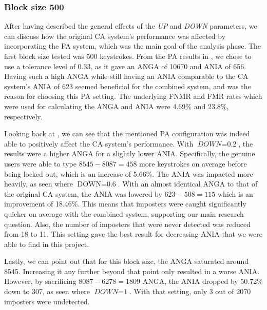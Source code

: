 \subsubsection{Block size 500}
After having described the general effects of the \textit{UP} and \textit{DOWN} parameters, we can discuss how the original CA system's performance was affected by incorporating the PA system, which was the main goal of the analysis phase.
The first block size tested was 500 keystrokes.
From the PA results in , we chose to use a tolerance level of 0.33, as it gave an ANGA of 10670 and ANIA of 656.
Having such a high ANGA while still having an ANIA comparable to the CA system's ANIA of 623 seemed beneficial for the combined system, and was the reason for choosing this PA setting.
The underlying FNMR and FMR rates which were used for calculating the ANGA and ANIA were 4.69\% and 23.8\%, respectively.

Looking back at , we can see that the mentioned PA configuration was indeed able to positively affect the CA system's performance.
With $\textit{DOWN} = \text{0.2}$, the results were a higher ANGA for a slightly lower ANIA.
Specifically, the genuine users were able to type $8545-8087 = 458$ more keystrokes on average before being locked out, which is an increase of 5.66\%.
The ANIA was impacted more heavily, as seen where $\text{DOWN} = \text{0.6}$.
With an almost identical ANGA to that of the original CA system, the ANIA was lowered by $\text{623}-\text{508} = \text{115}$ which is an improvement of 18.46\%.
This means that imposters were caught significantly quicker on average with the combined system, supporting our main research question.
Also, the number of imposters that were never detected was reduced from 18 to 11.
This setting gave the best result for decreasing ANIA that we were able to find in this project.

Lastly, we can point out that for this block size, the ANGA saturated around 8545.
Increasing it any further beyond that point only resulted in a worse ANIA.
However, by sacrificing $\text{8087} - \text{6278} = \text{1809}$ ANGA, the ANIA dropped by 50.72\% down to 307, as seen where $\textit{DOWN} = \text{1}$.
With that setting, only 3 out of 2070 imposters were undetected.



